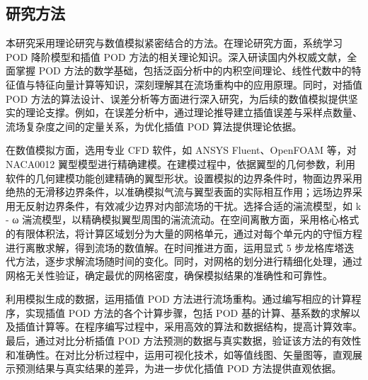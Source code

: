 \subsection{研究方法}
本研究采用理论研究与数值模拟紧密结合的方法。在理论研究方面，系统学习 POD 降阶模型和插值 POD 方法的相关理论知识。深入研读国内外权威文献，全面掌握 POD 方法的数学基础，包括泛函分析中的内积空间理论、线性代数中的特征值与特征向量计算等知识，深刻理解其在流场重构中的应用原理。同时，对插值 POD 方法的算法设计、误差分析等方面进行深入研究，为后续的数值模拟提供坚实的理论支撑。例如，在误差分析中，通过理论推导建立插值误差与采样点数量、流场复杂度之间的定量关系，为优化插值 POD 算法提供理论依据。

在数值模拟方面，选用专业 CFD 软件，如 ANSYS Fluent、OpenFOAM 等，对 NACA0012 翼型模型进行精确建模。在建模过程中，依据翼型的几何参数，利用软件的几何建模功能创建精确的翼型形状。设置模拟的边界条件时，物面边界采用绝热的无滑移边界条件，以准确模拟气流与翼型表面的实际相互作用；远场边界采用无反射边界条件，有效减少边界对内部流场的干扰。选择合适的湍流模型，如 k - ω 湍流模型，以精确模拟翼型周围的湍流流动。在空间离散方面，采用格心格式的有限体积法，将计算区域划分为大量的网格单元，通过对每个单元内的守恒方程进行离散求解，得到流场的数值解。在时间推进方面，运用显式 5 步龙格库塔迭代方法，逐步求解流场随时间的变化。同时，对网格的划分进行精细化处理，通过网格无关性验证，确定最优的网格密度，确保模拟结果的准确性和可靠性。

利用模拟生成的数据，运用插值 POD 方法进行流场重构。通过编写相应的计算程序，实现插值 POD 方法的各个计算步骤，包括 POD 基的计算、基系数的求解以及插值计算等。在程序编写过程中，采用高效的算法和数据结构，提高计算效率。最后，通过对比分析插值 POD 方法预测的数据与真实数据，验证该方法的有效性和准确性。在对比分析过程中，运用可视化技术，如等值线图、矢量图等，直观展示预测结果与真实结果的差异，为进一步优化插值 POD 方法提供直观依据。
